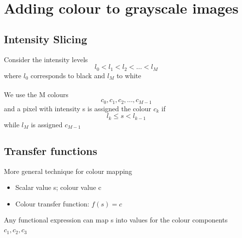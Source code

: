 \documentclass{article}[18pt]
\begin{document}
\section{Adding colour to grayscale images}
\subsection{Intensity Slicing}
Consider the intensity levels
$$l_0<l_1<l_2<...<l_M$$
where $l_0$ corresponds to black and $l_M$ to white\\
\\
We use the M colours
$$c_0,c_1,c_2,...,c_{M-1}$$
and a pixel with intensity s is assigned the colour $c_k$ if
$$l_k\leqslant s<l_{k-1}$$
while $l_M$ is assigned $c_{M-1}$
\subsection{Transfer functions}
More general technique for colour mapping
\begin{itemize}
	\item Scalar value s; colour value c
	\item Colour transfer function: $f(s)=c$
\end{itemize}
Any functional expression can map s into values for the colour components $c_1,c_2,c_3$
\end{document}
